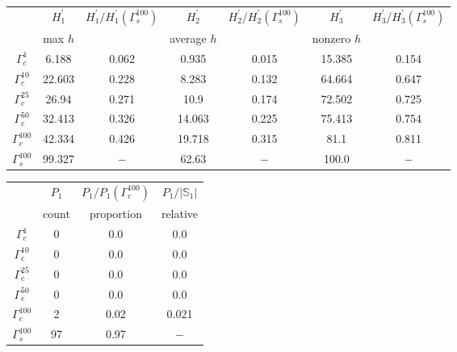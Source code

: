 \documentclass[paper=a4, fontsize=11pt]{scrartcl} %
\newcommand{\gcat}{\Gamma_{c}}
\newcommand{\gesp}{\Gamma_{s}}
\begin{document}
\begin{center}
    \begin{tabular}{||c||cc|cc|cc||}
        \hline\hline
        & $H_1^\prime$ & $H_1^\prime/H_1^\prime(\gesp^{100})$ & $H_2^\prime$ & $H_2^\prime/H_2^\prime(\gesp^{100})$ & $H_3^\prime$ & $H_3^\prime/H_3^\prime(\gesp^{100})$ \\
        & max $h$ & & average $h$ & & nonzero $h$ & \\
        \hline\hline
        $\gcat^{1}$ & 6.188 & 0.062 & 0.935 & 0.015 & 15.385 & 0.154 \\ %
        $\gcat^{10}$ & 22.603 & 0.228 & 8.283 & 0.132 & 64.664 & 0.647 \\ %
        $\gcat^{25}$ & 26.94 & 0.271 & 10.9 & 0.174 & 72.502 & 0.725 \\ %
        $\gcat^{50}$ & 32.413 & 0.326 & 14.063 & 0.225 & 75.413 & 0.754 \\ %
        $\gcat^{100}$ & 42.334 & 0.426 & 19.718 & 0.315 & 81.1 & 0.811 \\ %
        \hline
        $\gesp^{100}$ & 99.327 & $-$ & 62.63 & $-$ & 100.0 & $-$ \\ %
        \hline\hline
    \end{tabular}
\end{center}

\begin{center}
    \begin{tabular}{||c||ccc||}
        \hline\hline
        & $P_1$ & $P_1/P_1(\gcat^{100})$ & $P_1/|\mathbb{S}_1|$ \\
        & count & proportion & relative \\
        \hline\hline
        $\gcat^{1}$ & 0 & 0.0 & 0.0 \\ %
        $\gcat^{10}$ & 0 & 0.0 & 0.0 \\ %
        $\gcat^{25}$ & 0 & 0.0 & 0.0 \\ %
        $\gcat^{50}$ & 0 & 0.0 & 0.0 \\ %
        $\gcat^{100}$ & 2 & 0.02 & 0.021 \\ %
        \hline
        $\gesp^{100}$ & 97 & 0.97 & $-$ \\ %
        \hline\hline
    \end{tabular}
\end{center}
\end{document}
